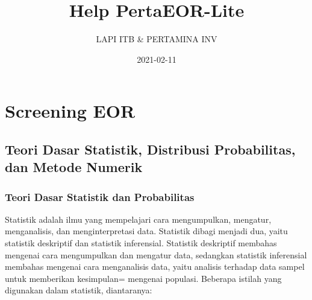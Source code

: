 \documentclass[
]{book}
\title{Help PertaEOR-Lite}
\author{LAPI ITB \& PERTAMINA INV}
\date{2021-02-11}
\begin{document}
\maketitle

{
\setcounter{tocdepth}{1}
\tableofcontents
}
\hypertarget{screening-eor}{%
\chapter{Screening EOR}\label{screening-eor}}

\hypertarget{teori-dasar-statistik-distribusi-probabilitas-dan-metode-numerik}{%
\section{Teori Dasar Statistik, Distribusi Probabilitas, dan Metode Numerik}\label{teori-dasar-statistik-distribusi-probabilitas-dan-metode-numerik}}

\hypertarget{teori-dasar-statistik-dan-probabilitas}{%
\subsection{Teori Dasar Statistik dan Probabilitas}\label{teori-dasar-statistik-dan-probabilitas}}

Statistik adalah ilmu yang mempelajari cara mengumpulkan, mengatur, menganalisis, dan menginterpretasi data. Statistik dibagi menjadi dua, yaitu statistik deskriptif dan statistik inferensial. Statistik deskriptif membahas mengenai cara mengumpulkan dan mengatur data, sedangkan statistik inferensial membahas mengenai cara menganalisis data, yaitu analisis terhadap data sampel untuk memberikan kesimpulan= mengenai populasi. Beberapa istilah yang digunakan dalam statistik, diantaranya:
\end{document}
